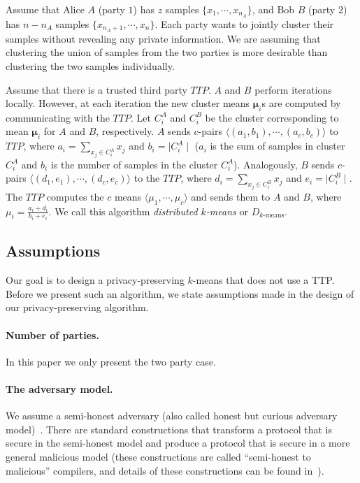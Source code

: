 Assume that Alice $A$ (party $1$) has $z$ samples $\{
x_1,\cdots,x_{n_A} \}$, and Bob $B$ (party $2$) has $n-n_A$ samples
$\{ x_{n_A + 1},\cdots,x_n \}$. Each party wants to jointly cluster
their samples without revealing any private information. We are
assuming that clustering the union of samples from the two parties is
more desirable than clustering the two samples individually.

Assume that there is a trusted third party $TTP$. $A$ and $B$ perform
iterations locally. However, at each iteration the new cluster means
$\mathbf{\mu}_i$s are computed by communicating with the $TTP$. Let
$C_i^A$ and $C_i^B$ be the cluster corresponding to mean
$\mathbf{\mu}_i$ for $A$ and $B$, respectively.  $A$ sends $c$-pairs
$\langle (a_1,b_1), \cdots, (a_c,b_c) \rangle$ to $TTP$, where $a_i =
\sum_{x_j \in C_i^A } x_j$ and $b_i = \mid C_i^A \mid$ ($a_i$ is the sum of
samples in cluster $C_i^A$ and $b_i$ is the number of samples in the
cluster $C_i^A$). Analogously, $B$ sends $c$-pairs $\langle (d_1,e_1),
\cdots, (d_c,e_c) \rangle$ to the $TTP$, where $d_i = \sum_{x_j \in
C_i^B } x_j$ and $e_i = \mid C_i^B \mid$. The $TTP$ computes the $c$
means $\langle \mu_1, \cdots, \mu_c \rangle$ and sends them to $A$ and
$B$, where $\mu_i = \frac{a_i+d_i}{b_i+e_i}$. We call this algorithm
{\em distributed $k$-means} or $D_{\mbox{$k$-means}}$.

\subsection{Assumptions}

Our goal is to design a privacy-preserving $k$-means that does not
use a TTP. Before we present such an algorithm, we state assumptions
made in the design of our  privacy-preserving algorithm.

\paragraph{Number of parties.} In this paper we only present the
two party case. 

\paragraph{The adversary model.} We assume a  semi-honest
adversary (also called honest but curious adversary model)~\cite{GoldreichBookVol2}.
There are standard constructions that transform a protocol that
is secure in the semi-honest model and produce a protocol that is
secure in a more general malicious model (these constructions are
called ``semi-honest to malicious'' compilers, and details of these
constructions can be found in~\cite{Goldreich:compiler:99}).

